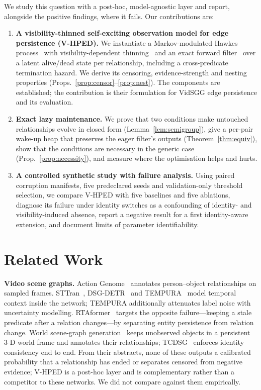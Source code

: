 \documentclass[conference]{IEEEtran}
\begin{document}
We study this question with a post-hoc, model-agnostic layer and report, alongside the
positive findings, where it fails. Our contributions are:
\begin{enumerate}
\item \textbf{A visibility-thinned self-exciting observation model for edge
persistence (V-HPED).} We instantiate a Markov-modulated Hawkes
process~\cite{hawkes1971,wang2012mmhp} with visibility-dependent
thinning~\cite{lewis1979} and an exact forward filter~\cite{rabiner1989} over a latent
alive/dead state per relationship, including a cross-predicate termination hazard. We
derive its censoring, evidence-strength and nesting properties
(Props.~\ref{prop:censor}--\ref{prop:nest}). The components are established; the
contribution is their formulation for VidSGG edge persistence and its evaluation.
\item \textbf{Exact lazy maintenance.} We prove that two conditions make untouched
relationships evolve in closed form (Lemma~\ref{lem:semigroup}), give a per-pair
wake-up heap that preserves the eager filter's outputs (Theorem~\ref{thm:equiv}),
show that the conditions are necessary in the generic case
(Prop.~\ref{prop:necessity}), and measure where the optimisation helps and hurts.
\item \textbf{A controlled synthetic study with failure analysis.} Using paired
corruption manifests, five predeclared seeds and validation-only threshold
selection, we compare V-HPED with five baselines and five ablations, diagnose its
failure under identity switches as a confounding of identity- and
visibility-induced absence, report a negative result for a first identity-aware
extension, and document limits of parameter identifiability.
\end{enumerate}

\section{Related Work}
\textbf{Video scene graphs.} Action Genome~\cite{ji2020ag} annotates person--object
relationships on sampled frames. STTran~\cite{cong2021sttran}, DSG-DETR~\cite{feng2023dsgdetr}
and TEMPURA~\cite{nag2023tempura} model temporal context inside the network; TEMPURA
additionally attenuates label noise with uncertainty modelling. RTAformer~\cite{heo2026rtaformer}
targets the opposite failure---keeping a stale predicate after a relation changes---by
separating entity persistence from relation change. World scene-graph
generation~\cite{peddi2026wsgg} keeps unobserved objects in a persistent 3-D world
frame and annotates their relationships; TCDSG~\cite{ruschel2024tcdsg} enforces
identity consistency end to end. From their abstracts, none of these outputs a
calibrated probability that a relationship has ended or separates censored from
negative evidence; V-HPED is a post-hoc layer and is complementary rather than a
competitor to these networks. We did not compare against them empirically.
\end{document}
